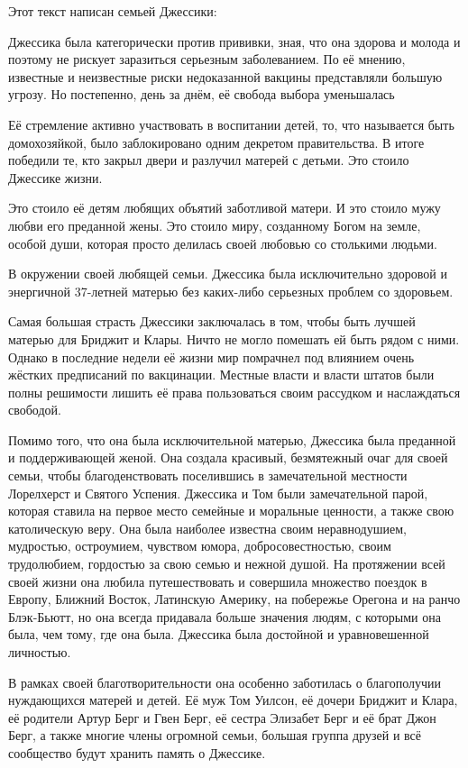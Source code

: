 Этот текст написан семьей Джессики:

Джессика была категорически против прививки, зная, что она здорова и молода и
поэтому не рискует заразиться серьезным заболеванием. По её мнению, известные и
неизвестные риски недоказанной вакцины представляли большую угрозу. Но
постепенно, день за днём, её свобода выбора уменьшалась

Её стремление активно участвовать в воспитании детей, то, что называется быть
домохозяйкой, было заблокировано одним декретом правительства. В итоге победили
те, кто закрыл двери и разлучил матерей с детьми. Это стоило Джессике жизни.

Это стоило её детям любящих объятий заботливой матери. И это стоило мужу любви
его преданной жены. Это стоило миру, созданному Богом на земле, особой души,
которая просто делилась своей любовью со столькими людьми.

В окружении своей любящей семьи. Джессика была исключительно здоровой и
энергичной 37-летней матерью без каких-либо серьезных проблем со здоровьем.

Самая большая страсть Джессики заключалась в том, чтобы быть лучшей матерью для
Бриджит и Клары. Ничто не могло помешать ей быть рядом с ними. Однако в
последние недели её жизни мир помрачнел под влиянием очень жёстких предписаний
по вакцинации. Местные власти и власти штатов были полны решимости лишить её
права пользоваться своим рассудком и наслаждаться свободой.

Помимо того, что она была исключительной матерью, Джессика была преданной и
поддерживающей женой. Она создала красивый, безмятежный очаг для своей семьи,
чтобы благоденствовать поселившись в замечательной местности Лорелхерст и
Святого Успения. Джессика и Том были замечательной парой, которая ставила на
первое место семейные и моральные ценности, а также свою католическую веру.  Она
была наиболее известна своим неравнодушием, мудростью, остроумием, чувством
юмора, добросовестностью, своим трудолюбием, гордостью за свою семью и нежной
душой. На протяжении всей своей жизни она любила путешествовать и совершила
множество поездок в Европу, Ближний Восток, Латинскую Америку, на побережье
Орегона и на ранчо Блэк-Бьютт, но она всегда придавала больше значения людям, с
которыми она была, чем тому, где она была. Джессика была достойной и
уравновешенной личностью.

В рамках своей благотворительности она особенно заботилась о благополучии
нуждающихся матерей и детей. Её муж Том Уилсон, её дочери Бриджит и Клара, её
родители Артур Берг и Гвен Берг, её сестра Элизабет Берг и её брат Джон Берг, а
также многие члены огромной семьи, большая группа друзей и всё сообщество будут
хранить память о Джессике.
